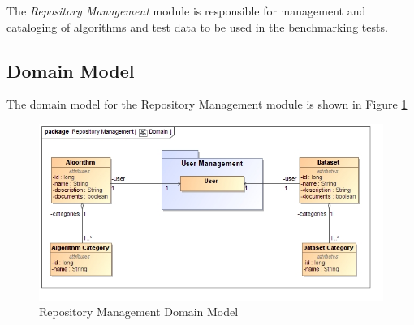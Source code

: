 The \textit{Repository Management} module is responsible for management and cataloging of
algorithms and test data to be used in the benchmarking tests.

\subsection{Domain Model}
The domain model for the Repository Management module is shown in Figure \ref{fig:repoManDomain}
\begin{figure}[H]
  \begin{center}
  \includegraphics[scale=0.38]{../Diagrams and Charts/Repository Management/Domain.jpg}  
  \caption{Repository Management Domain Model}
  \label{fig:repoManDomain}
  \end{center}  
\end{figure}




